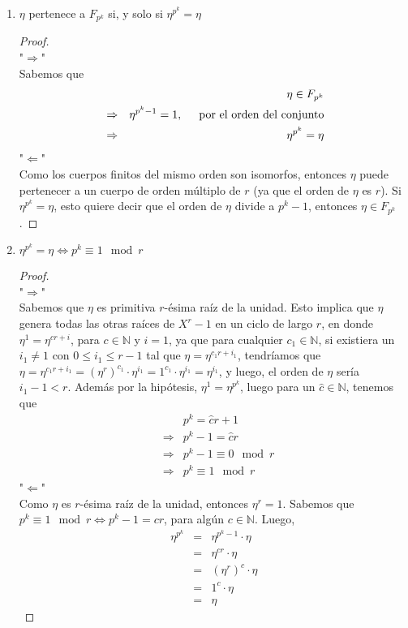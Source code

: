 \documentclass[10pt]{article}
\newcommand{\0}{\mathbf{0}}
\newcommand{\1}{\mathbf{1}}
\newcommand{\modl}{\mod}
\newcommand{\+}{\oplus}
\newcommand{\comentario}[1]{}
\theoremstyle{remark}
\theoremstyle{remark}
\begin{document}
	\begin{enumerate}
		\item $\eta$ pertenece a $F_{p^k}$ si, y solo si $\eta^{p^k}=\eta$
		\begin{proof}
			\text{ }\\
			"$\Rightarrow$"\\
			Sabemos que 
			\begin{eqnarray}
				& &\eta \in F_{p^k}\nonumber\\
				&\Rightarrow &\eta^{p^k-1} = 1, \hspace{0.5cm} \text{por el orden del conjunto}\nonumber\\
				&\Rightarrow &\eta^{p^k}=\eta
			\end{eqnarray}
			"$\Leftarrow$"\\
			Como los cuerpos finitos del mismo orden son isomorfos\comentario{ojo con esta propiedad}, entonces $\eta$ puede pertenecer a un cuerpo de orden múltiplo de $r$ (ya que el orden de $\eta$ es $r$). Si $\eta^{p^k}=\eta$, esto quiere decir que el orden de $\eta$ divide a $p^k-1$, entonces $\eta \in F_{p^k}$. 
		\end{proof}
		
		\item $\eta^{p^k}=\eta\Leftrightarrow p^k\equiv 1 \modl r$
		\begin{proof}
			\text{ }\\
			"$\Rightarrow$"\\
			Sabemos que $\eta$ es primitiva $r$-ésima raí­z de la unidad. Esto implica que $\eta$ genera todas las otras raí­ces de $X^r-1$ en un ciclo de largo $r$, en donde $\eta^1=\eta^{cr+i}$, para $c\in \mathbb{N}$ y $i=1$, ya que para cualquier $c_1\in \mathbb{N}$, si existiera un  $i_1\neq 1$ con $0\leq i_1\leq r-1$ tal que $\eta=\eta^{c_1r+i_1}$, tendrí­amos que $\eta = \eta^{c_1r+i_1} =(\eta^{r})^{c_1}\cdot\eta^{i_1}=1^{c_1}\cdot\eta^{i_1}=\eta^{i_1}$, y luego, el orden de $\eta$ serí­a $i_1-1<r$. Además por la hipótesis, $\eta^1=\eta^{p^k}$, luego para un $\hat c\in \mathbb{N}$, tenemos que 
			\begin{eqnarray}
				& &p^k=\hat c r+1\nonumber\\
				&\Rightarrow &p^k-1 = \hat c r\nonumber\\
				&\Rightarrow &p^k-1\equiv 0\modl r\nonumber\\
				&\Rightarrow &p^k\equiv 1\modl r\nonumber
			\end{eqnarray}	
			"$\Leftarrow$"\\
			Como $\eta$ es $r$-ésima raí­z de la unidad, entonces $\eta^r = 1$. Sabemos que $p^k\equiv 1 \modl r \Leftrightarrow p^k-1 = cr$, para algún $c\in\mathbb{N}$. Luego,
			\begin{eqnarray}
				\eta^{p^k}&=& \eta^{p^k-1}\cdot\eta\nonumber\\
				&=&\eta^{cr}\cdot\eta\nonumber\\
				&=&(\eta^r)^c\cdot \eta \nonumber\\
				&=& 1^c\cdot\eta \nonumber\\
				&=& \eta\nonumber
			\end{eqnarray}			 					
		\end{proof}
	\end{enumerate}
\end{document}
